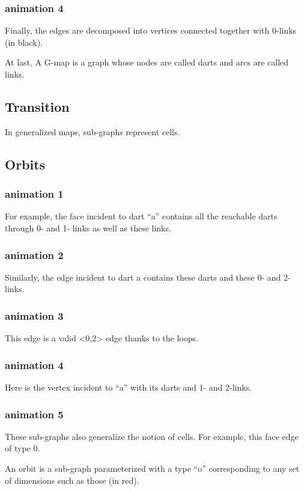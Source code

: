 \documentclass[11pt]{article}
\begin{document}
\subsubsection{animation 4}
\label{sec:org5500e3b}
Finally, the edges are decomposed into vertices connected together with 0-links
(in black).

At last, A G-map is a graph whose nodes are called darts and arcs are called
links.

\subsection{Transition}
\label{sec:org49034de}
In generalized maps, sub-graphs represent cells.

\subsection{Orbits}
\label{sec:org2d28487}

\subsubsection{animation 1}
\label{sec:org474961d}
For example, the face incident to dart ``a'' contains all the reachable darts
through 0- and 1- links as well as these links.
\subsubsection{animation 2}
\label{sec:orgb48e2f9}
Similarly, the edge incident to dart a contains these darts and these 0- and
2-links.
\subsubsection{animation 3}
\label{sec:org45b5118}
This edge is a valid <0,2> edge thanks to the loops.
\subsubsection{animation 4}
\label{sec:org319b926}
Here is the vertex incident to ``a'' with its darts and 1- and 2-links.
\subsubsection{animation 5}
\label{sec:org78d3257}
These sub-graphs also generalize the notion of cells. For example, this face
edge of type 0.

An orbit is a sub-graph parameterized with a type ``o'' corresponding to any set
of dimensions such as those (in red).
\end{document}
